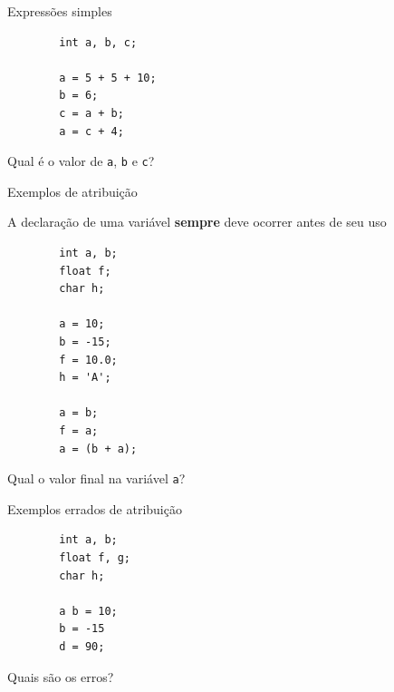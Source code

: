 \documentclass[handout]{beamer}
\begin{document}
\begin{frame}[fragile]{Expressões simples}

    \begin{verbatim}
        int a, b, c;

        a = 5 + 5 + 10;
        b = 6;
        c = a + b;
        a = c + 4;
    \end{verbatim}

    Qual é o valor de \texttt{a}, \texttt{b} e \texttt{c}?

\end{frame}

\begin{frame}[fragile]{Exemplos de atribuição}

    A declaração de uma variável \textbf{sempre} deve ocorrer antes de seu uso

    \begin{verbatim}
        int a, b;
        float f;
        char h;

        a = 10;
        b = -15;
        f = 10.0;
        h = 'A';

        a = b;
        f = a;
        a = (b + a);
    \end{verbatim}

    Qual o valor final na variável \texttt{a}?

\end{frame}


\begin{frame}[fragile]{Exemplos errados de atribuição}

    \begin{verbatim}
        int a, b;
        float f, g;
        char h;

        a b = 10;
        b = -15
        d = 90;
    \end{verbatim}

    Quais são os erros?
\end{frame}

\end{document}
